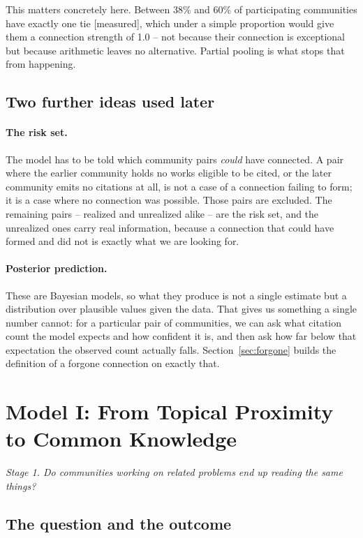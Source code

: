 \documentclass[11pt]{article}
\newcommand{\seccap}[1]{{\slshape\small #1\par}\vspace{0.8em}}
\newcommand{\meas}{{\footnotesize\textsf{[measured]}}}
\begin{document}
This matters concretely here. Between 38\% and 60\% of participating communities have
exactly one tie \meas{}, which under a simple proportion would give them a connection
strength of 1.0 -- not because their connection is exceptional but because arithmetic
leaves no alternative. Partial pooling is what stops that from happening.

\subsection{Two further ideas used later}

\paragraph{The risk set.} The model has to be told which community pairs \emph{could} have
connected. A pair where the earlier community holds no works eligible to be cited, or the
later community emits no citations at all, is not a case of a connection failing to form;
it is a case where no connection was possible. Those pairs are excluded. The remaining pairs
-- realized and unrealized alike -- are the risk set, and the unrealized ones carry real
information, because a connection that could have formed and did not is exactly what we are
looking for.

\paragraph{Posterior prediction.} These are Bayesian models, so what they produce is not a
single estimate but a distribution over plausible values given the data. That gives us
something a single number cannot: for a particular pair of communities, we can ask what
citation count the model expects and how confident it is, and then ask how far below that
expectation the observed count actually falls. Section~\ref{sec:forgone} builds the
definition of a forgone connection on exactly that.

\section{Model I: From Topical Proximity to Common Knowledge}
\label{sec:modelI}
\seccap{Stage 1. Do communities working on related problems end up reading the same
things?}

\subsection{The question and the outcome}
\end{document}
